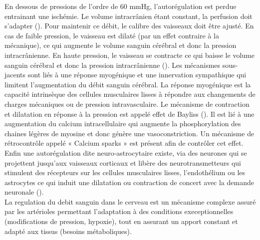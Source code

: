 En dessous de pressions de l’ordre de 60 mmHg, l’autorégulation est perdue
entrainant une ischémie. Le volume intracrânien étant constant, la perfusion doit s’adapter (\cite{Cipolla2009}). Pour
maintenir ce débit, le calibre des vaisseaux doit être ajusté. En cas de faible pression, le vaisseau est
dilaté (par un effet contraire à la mécanique), ce qui augmente le volume sanguin cérébral et donc la
pression intracrânienne. En haute pression, le vaisseau se contracte ce qui baisse le volume sanguin
cérébral et donc la pression intracrânienne (\cite{Lang2003}). Les mécanismes sous-jacents sont liés à une réponse
myogénique et une innervation sympathique qui limitent l’augmentation du débit sanguin cérébral. La
réponse myogénique est la capacité intrinsèque des cellules musculaires lisses à répondre aux
changements de charges mécaniques ou de pression intravasculaire. Le mécanisme de contraction et
dilatation en réponse à la pression est appelé effet de Bayliss (\cite{Cipolla2009}). Il est lié à une augmentation du
calcium intracellulaire qui augmente la phosphorylation des chaines légères de myosine et donc
génère une vasoconstriction. Un mécanisme de rétrocontrôle appelé « Calcium sparks » est présent
afin de contrôler cet effet.\\
Enfin une autorégulation dite neuro-astrocytaire existe, via des neurones qui se projettent
jusqu’aux vaisseaux corticaux et libère des neurotransmetteurs qui stimulent des récepteurs sur les
cellules musculaires lisses, l’endothélium ou les astrocytes ce qui induit une dilatation ou contraction
de concert avec la demande neuronale (\cite{Cipolla2009}).\\
La regulation du debit sanguin dans le cerveau est un mécanisme complexe assuré par les
artérioles permettant l’adaptation à des conditions execeptionnelles (modifications de pression,
hypoxie), tout en assurant un apport constant et adapté aux tissus (besoins métaboliques).
